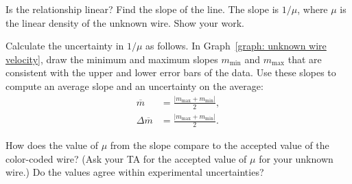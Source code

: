 \documentclass[addpoints]{physlabs}
\begin{document}
\begin{postlab}
    \begin{center}
    \captionsetup{font=normalsize}
    \end{center}

    \vspace{1cm}
    Is the relationship linear? Find the slope of the line. The slope is $1/\mu$, where $\mu$ is the linear density of the unknown wire. Show your work.
    \begin{solution}[4cm]
        
    \end{solution}

    \filbreak
    \question[2] Calculate the uncertainty in $1/\mu$ as follows. In Graph~\ref{graph: unknown wire velocity}, draw the minimum and maximum slopes $m_\text{min}$ and $m_\text{max}$ that are consistent with the upper and lower error bars of the data. Use these slopes to compute an average slope and an uncertainty on the average:
    \begin{align*}
        \overline{m} &= \frac{|m_\text{max} + m_\text{min}|}{2},
        \\
        \Delta\overline{m} &= \frac{|m_\text{max} + m_\text{min}|}{2}.
    \end{align*}
    \begin{solution}[4cm]
        
    \end{solution}

    \filbreak
    \question[1] How does the value of $\mu$ from the slope compare to the accepted value of the color-coded wire? (Ask your TA for the accepted value of $\mu$ for your unknown wire.) Do the values agree within experimental uncertainties?
    \begin{solution}[4cm]
        

\end{solution}
\end{postlab}
\end{document}

